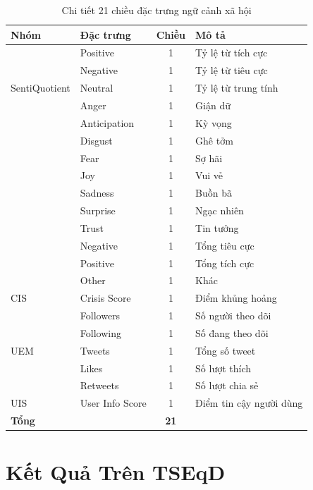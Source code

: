 \documentclass[12pt,a4paper]{article}
\begin{document}
\begin{table}[H]
\centering
\caption{Chi tiết 21 chiều đặc trưng ngữ cảnh xã hội}
\label{tab:social_detail}
\begin{tabular}{l|l|c|l}
\toprule
\textbf{Nhóm} & \textbf{Đặc trưng} & \textbf{Chiều} & \textbf{Mô tả} \\
\midrule
\multirow{5}{*}{SentiQuotient} 
& Positive & 1 & Tỷ lệ từ tích cực \\
& Negative & 1 & Tỷ lệ từ tiêu cực \\
& Neutral & 1 & Tỷ lệ từ trung tính \\
\midrule
\multirow{11}{*}{EmoQuotient}
& Anger & 1 & Giận dữ \\
& Anticipation & 1 & Kỳ vọng \\
& Disgust & 1 & Ghê tởm \\
& Fear & 1 & Sợ hãi \\
& Joy & 1 & Vui vẻ \\
& Sadness & 1 & Buồn bã \\
& Surprise & 1 & Ngạc nhiên \\
& Trust & 1 & Tin tưởng \\
& Negative & 1 & Tổng tiêu cực \\
& Positive & 1 & Tổng tích cực \\
& Other & 1 & Khác \\
\midrule
CIS & Crisis Score & 1 & Điểm khủng hoảng \\
\midrule
\multirow{5}{*}{UEM}
& Followers & 1 & Số người theo dõi \\
& Following & 1 & Số đang theo dõi \\
& Tweets & 1 & Tổng số tweet \\
& Likes & 1 & Số lượt thích \\
& Retweets & 1 & Số lượt chia sẻ \\
\midrule
UIS & User Info Score & 1 & Điểm tin cậy người dùng \\
\midrule
\multicolumn{2}{l|}{\textbf{Tổng}} & \textbf{21} & \\
\bottomrule
\end{tabular}
\end{table}

\section{Kết Quả Trên TSEqD}
\end{document}
